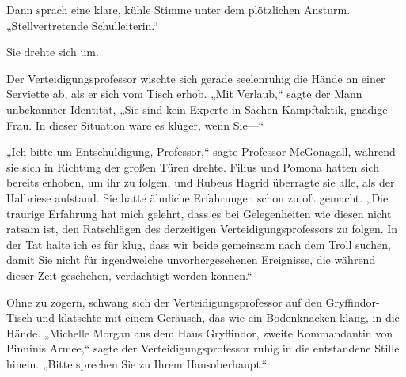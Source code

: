 
Dann sprach eine klare, kühle Stimme unter dem plötzlichen Ansturm. „Stellvertretende Schulleiterin.“

Sie drehte sich um.

Der Verteidigungsprofessor wischte sich gerade seelenruhig die Hände an einer Serviette ab, als er sich vom Tisch erhob. „Mit Verlaub,“ sagte der Mann unbekannter Identität, „Sie sind kein Experte in Sachen Kampftaktik, gnädige Frau. In dieser Situation wäre es klüger, wenn Sie—“

„Ich bitte um Entschuldigung, Professor,“ sagte Professor McGonagall, während sie sich in Richtung der großen Türen drehte. Filius und Pomona hatten sich bereits erhoben, um ihr zu folgen, und Rubeus Hagrid überragte sie alle, als der Halbriese aufstand. Sie hatte ähnliche Erfahrungen schon zu oft gemacht. „Die traurige Erfahrung hat mich gelehrt, dass es bei Gelegenheiten wie diesen nicht ratsam ist, den Ratschlägen des derzeitigen Verteidigungsprofessors zu folgen. In der Tat halte ich es für klug, dass wir beide gemeinsam nach dem Troll suchen, damit Sie nicht für irgendwelche unvorhergesehenen Ereignisse, die während dieser Zeit geschehen, verdächtigt werden können.“


Ohne zu zögern, schwang sich der Verteidigungsprofessor auf den Gryffindor-Tisch und klatschte mit einem Geräusch, das wie ein Bodenknacken klang, in die Hände. „Michelle Morgan aus dem Haus Gryffindor, zweite Kommandantin von Pinninis Armee,“ sagte der Verteidigungsprofessor ruhig in die entstandene Stille hinein. „Bitte sprechen Sie zu Ihrem Hausoberhaupt.“

